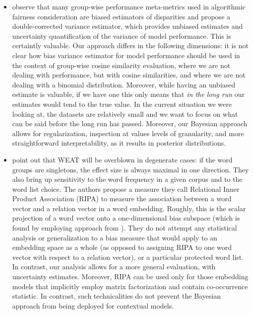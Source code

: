 \documentclass{clv3}
\begin{document}
\begin{itemize}
\item \citet{Lum2022Debiasing} observe that many group-wise performance meta-metrics used in algorithmic fairness consideration are biased estimators of disparities and propose a double-corrected variance estimator, which provides unbiased estimates and uncertainty quantification of the variance of model performance. This is certaintly valuable. Our approach differs in the following dimensions: it is not clear how bias variance estimator for model performance should be used in the context of group-wise cosine similarity evaluation, where we are not dealing with performance, but with cosine similarities, and where we are not dealing with a binomial distribution. Moreover, while having an unbiased estimate is valuable, if we have one this only means that \emph{in the long run} our estimates would tend to the true value. In the current situation we were looking at, the datasets are relatively small and we want to focus on what can be said before the long run has passed. Moreover, our Bayesian approach allows for regularization, inspection at values levels of granularity, and more straightforward interpretability, as it results in posterior distributions.

\item \citet{Ethayarajh2019understanding} point out that WEAT will be overblown in degenerate cases: if the word groups are singletons, the effect size is always maximal in one direction. They also bring up  sensitivity to the word frequency in a given corpus and to the word list choice. The authors propose a measure they call Relational Inner Product Association (RIPA) to measure the association between a word vector and a relation vector in  a  word embedding. Roughly, this is  the scalar projection of a word vector onto a one-dimensional bias subspace (which is found by employing approach from \citet{Bolukbasi2016man}). They do not attempt any statistical analysis or generalization to a bias measure that would apply to an embedding space as a whole (as opposed to assigning RIPA to one word vector with respect to a relation vector), or a particular protected word list. In contrast, our analysis allows for a more general evaluation, with uncertainty estimates. Moreover, RIPA can be used only for those embedding models that implicitly employ matrix factorization and contain co-occurrence statistic. In contrast, such technicalities do not prevent the Bayesian approach from being deployed for contextual models.


\end{itemize}
\end{document}
